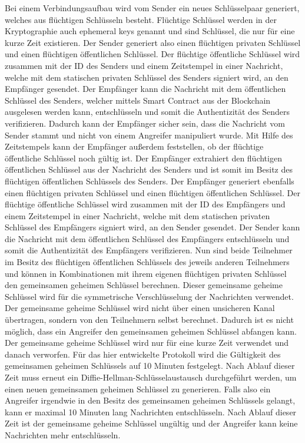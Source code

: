 Bei einem Verbindungsaufbau wird vom Sender ein neues Schlüsselpaar generiert, welches aus flüchtigen Schlüsseln besteht. Flüchtige Schlüssel werden in der Kryptographie auch ephemeral keys genannt und sind Schlüssel, die nur für eine kurze Zeit existieren. Der Sender generiert also einen flüchtigen privaten Schlüssel und einen flüchtigen öffentlichen Schlüssel. Der flüchtige öffentliche Schlüssel wird zusammen mit der ID des Senders und einem Zeitstempel in einer Nachricht, welche mit dem statischen privaten Schlüssel des Senders signiert wird, an den Empfänger gesendet. Der Empfänger kann die Nachricht mit dem öffentlichen Schlüssel des Senders, welcher mittels Smart Contract aus der Blockchain ausgelesen werden kann, entschlüsseln und somit die Authentizität des Senders verifizieren. Dadurch kann der Empfänger sicher sein, dass die Nachricht vom Sender stammt und nicht von einem Angreifer manipuliert wurde. Mit Hilfe des Zeitstempels kann der Empfänger außerdem feststellen, ob der flüchtige öffentliche Schlüssel noch gültig ist. Der Empfänger extrahiert den flüchtigen öffentlichen Schlüssel aus der Nachricht des Senders und ist somit im Besitz des flüchtigen öffentlichen Schlüssels des Senders. Der Empfänger generiert ebenfalls einen flüchtigen privaten Schlüssel und einen flüchtigen öffentlichen Schlüssel. Der flüchtige öffentliche Schlüssel wird zusammen mit der ID des Empfängers und einem Zeitstempel in einer Nachricht, welche mit dem statischen privaten Schlüssel des Empfängers signiert wird, an den Sender gesendet. Der Sender kann die Nachricht mit dem öffentlichen Schlüssel des Empfängers entschlüsseln und somit die Authentizität des Empfängers verifizieren. Nun sind beide Teilnehmer im Besitz des flüchtigen öffentlichen Schlüssels des jeweils anderen Teilnehmers und können in Kombinationen mit ihrem eigenen flüchtigen privaten Schlüssel den gemeinsamen geheimen Schlüssel berechnen. Dieser gemeinsame geheime Schlüssel wird für die symmetrische Verschlüsselung der Nachrichten verwendet. Der gemeinsame geheime Schlüssel wird nicht über einen unsicheren Kanal übertragen, sondern von den Teilnehmern selbst berechnet. Dadurch ist es nicht möglich, dass ein Angreifer den gemeinsamen geheimen Schlüssel abfangen kann. Der gemeinsame geheime Schlüssel wird nur für eine kurze Zeit verwendet und danach verworfen. Für das hier entwickelte Protokoll wird die Gültigkeit des gemeinsamen geheimen Schlüssels auf 10 Minuten festgelegt. Nach Ablauf dieser Zeit muss erneut ein Diffie-Hellman-Schlüsselaustausch durchgeführt werden, um einen neuen gemeinsamen geheimen Schlüssel zu generieren. Falls also ein Angreifer irgendwie in den Besitz des gemeinsamen geheimen Schlüssels gelangt, kann er maximal 10 Minuten lang Nachrichten entschlüsseln. Nach Ablauf dieser Zeit ist der gemeinsame geheime Schlüssel ungültig und der Angreifer kann keine Nachrichten mehr entschlüsseln.

